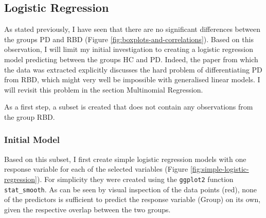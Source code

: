 \documentclass[
  english,
  doc,floatsintext]{apa6}
\newenvironment{Shaded}{\begin{snugshade}}{\end{snugshade}}
\newcommand{\AttributeTok}[1]{\textcolor[rgb]{0.77,0.63,0.00}{#1}}
\newcommand{\FunctionTok}[1]{\textcolor[rgb]{0.00,0.00,0.00}{#1}}
\newcommand{\NormalTok}[1]{#1}
\newcommand{\OtherTok}[1]{\textcolor[rgb]{0.56,0.35,0.01}{#1}}
\newcommand{\SpecialCharTok}[1]{\textcolor[rgb]{0.00,0.00,0.00}{#1}}
\newcommand{\StringTok}[1]{\textcolor[rgb]{0.31,0.60,0.02}{#1}}
\begin{document}
\hypertarget{logistic-regression}{%
\subsection{Logistic Regression}\label{logistic-regression}}

As stated previously, I have seen that there are no significant differences between the groups PD and RBD (Figure \ref{fig:boxplots-and-correlations}).
Based on this observation, I will limit my initial investigation to creating a logistic regression model predicting
between the groups HC and PD. Indeed, the paper from which the data was extracted explicitly
discusses the hard problem of differentiating PD from RBD, which might very well be impossible with
generalised linear models. I will revisit this problem in the section Multinomial Regression.

As a first step, a subset is created that does not contain any observations from the group RBD.

\begin{Shaded}
\end{Shaded}

\hypertarget{initial-model}{%
\subsubsection{Initial Model}\label{initial-model}}

Based on this subset, I first create simple logistic regression models with one response variable
for each of the selected variables (Figure \ref{fig:simple-logistic-regression}). For simplicity
they were created using the \texttt{ggplot2} function \texttt{stat\_smooth}. As can be seen by visual inspection
of the data points (red), none of the predictors is sufficient to predict the response variable
(Group) on its own, given the respective overlap between the two groups.
\end{document}
